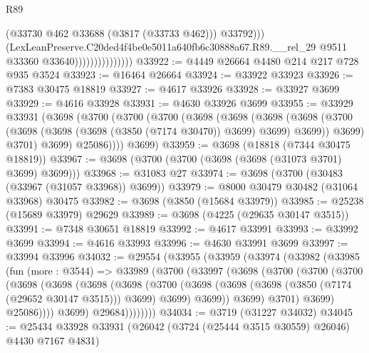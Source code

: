 \begin{lexlean}{R89}
\begin{coremodule}
                                      (@33730 @462 @33688 (@3817 (@33733 @462)))
                                      @33792)))
                                (LexLeanPreserve.C20ded4f4be0e5011a640fb6c30888a67.R89.__rel_29
                                  @9511
                                  @33360
                                  @33640)))))))))))))))
@33922 := @4449 @26664 @4480 @214 @217 @728 @935 @3524
@33923 := @16464 @26664
@33924 := @33922 @33923
@33926 := @7383 @30475 @18819
@33927 := @4617 @33926
@33928 := @33927 @3699
@33929 := @4616 @33928
@33931 := @4630 @33926 @3699
@33955 := @33929
    @33931
    (@3698
      (@3700
        (@3700
          (@3700
            (@3698
              (@3698
                (@3698
                  (@3698
                    (@3700 (@3698 (@3698 (@3698 (@3850 (@7174 @30470)) @3699) @3699) @3699))
                    @3699)
                  @3701)
                @3699)
              @25086))))
      @3699)
@33959 := @3698 (@18818 (@7344 @30475 @18819))
@33967 := @3698 (@3700 (@3700 (@3698 (@3698 (@31073 @3701) @3699) @3699)))
@33968 := @31083 @27
@33974 := @3698 (@3700 (@30483 (@33967 (@31057 @33968)) @3699))
@33979 := @8000 @30479 @30482 (@31064 @33968) @30475
@33982 := @3698 (@3850 (@15684 @33979))
@33985 := @25238 (@15689 @33979) @29629
@33989 := @3698 (@4225 (@29635 @30147 @3515))
@33991 := @7348 @30651 @18819
@33992 := @4617 @33991
@33993 := @33992 @3699
@33994 := @4616 @33993
@33996 := @4630 @33991 @3699
@33997 := @33994 @33996
@34032 := @29554
    (@33955
      (@33959
        (@33974
          (@33982
            (@33985
              (fun (more : @3544) =>
              @33989
                (@3700
                  (@33997
                    (@3698
                      (@3700
                        (@3700
                          (@3700
                            (@3698
                              (@3698
                                (@3698
                                  (@3698
                                    (@3700
                                      (@3698
                                        (@3698
                                          (@3698 (@3850 (@7174 (@29652 @30147 @3515))) @3699)
                                          @3699)
                                        @3699))
                                    @3699)
                                  @3701)
                                @3699)
                              @25086))))
                      @3699)
                    @29684))))))))
@34034 := @3719 (@31227 @34032)
@34045 := @25434 @33928 @33931 (@26042 (@3724 (@25444 @3515 @30559) @26046) @4430 @7167 @4831)

\end{coremodule}
\end{lexlean}
